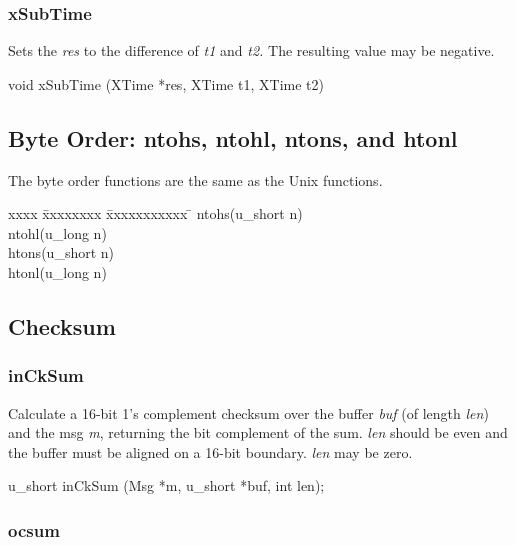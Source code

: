 \subsubsection{xSubTime}

Sets the {\em res} to the difference of {\em t1} and {\em t2.}
The resulting value may be negative.
\medskip

{\sem void} {\bold xSubTime} 
({\sem XTime} *{\caps res}, {\sem XTime} {\caps t1}, {\sem XTime} {\caps t2})
\medskip




\subsection{Byte Order: ntohs, ntohl, ntons, and htonl}

The byte order functions are the same as the Unix functions.
\medskip

\begin{tabbing}
xxxx \= xxxxxxxx \= xxxxxxxxxxx \= \kill
{} {\bold ntohs}({\sem u\_short} {\caps n})\\
 {\bold ntohl}({\sem u\_long} {\caps n})\\
 {\bold htons}({\sem u\_short} {\caps n})\\
 {\bold htonl}({\sem u\_long} {\caps n})\\
\end{tabbing}

\subsection{Checksum}

\subsubsection{inCkSum}

Calculate a 16-bit 1's complement checksum over the buffer
{\em *buf} (of length {\em len}) and the msg {\em *m}, returning the bit
complement of the sum.  {\em len} should be even and the buffer must be
aligned on a 16-bit boundary.  {\em len} may be zero.
\medskip

{\sem u\_short} {\bold inCkSum} ({\sem Msg} *{\caps m}, {\sem u\_short} *{\caps buf}, {\sem int} {\caps len});

\subsubsection{ocsum}

